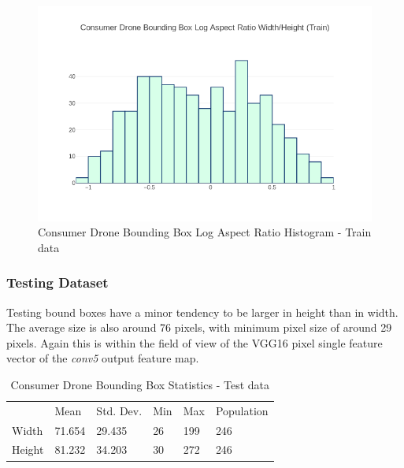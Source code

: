 \documentclass{IEEEtran}
\begin{document}
\begin{figure}[h]
\centering
\label{consumerdronetrainaspect}
\includegraphics[scale=0.4]{images/train-aspect.png}
\caption{Consumer Drone Bounding Box Log Aspect Ratio Histogram - Train data}
\end{figure}

\subsubsection{Testing Dataset}

Testing bound boxes have a minor tendency to be larger in height than in width. The average size is also around 76 pixels, with minimum pixel size of around 29 pixels. Again this is within the field of view of the VGG16 pixel single feature vector of the \textit{conv5} output feature map. 

\begin{table}[ht]
\caption{Consumer Drone Bounding Box Statistics - Test data}
\centering
\begin{tabular}{llllll}
       & Mean   & Std. Dev. & Min & Max & Population\\
Width  & 71.654 & 29.435 & 26 & 199 & 246 \\
Height & 81.232 & 34.203 & 30 & 272 & 246
\end{tabular}
\end{table}
\end{document}
